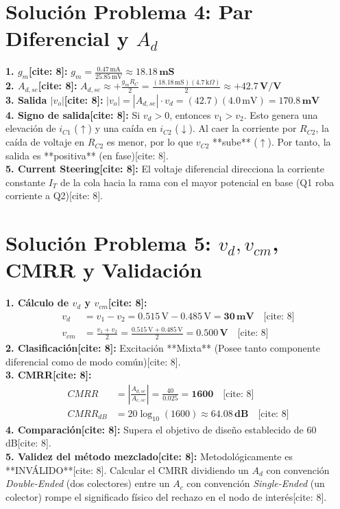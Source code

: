 \documentclass[11pt, a4paper]{article}
\begin{document}
\section*{Solución Problema 4: Par Diferencial y $A_d$}
\textbf{1. $g_m$[cite: 8]:} \quad $\displaystyle g_m = \frac{0.47\,\text{mA}}{25.85\,\text{mV}} \approx \mathbf{18.18\,\text{mS}}$ \\
\textbf{2. $A_{d,se}$[cite: 8]:} \quad $\displaystyle A_{d,se} \approx +\frac{g_m R_C}{2} = \frac{(18.18\,\text{mS})(4.7\,\text{k}\Omega)}{2} \approx \mathbf{+42.7\,\text{V/V}}$ \\
\textbf{3. Salida $|v_o|$[cite: 8]:} \quad $\displaystyle |v_o| = |A_{d,se}| \cdot v_d = (42.7)(4.0\,\text{mV}) = \mathbf{170.8\,\text{mV}}$ \\
\textbf{4. Signo de salida[cite: 8]:} Si $v_d > 0$, entonces $v_1 > v_2$. Esto genera una elevación de $i_{C1}$ ($\uparrow$) y una caída en $i_{C2}$ ($\downarrow$). Al caer la corriente por $R_{C2}$, la caída de voltaje en $R_{C2}$ es menor, por lo que $v_{C2}$ **sube** ($\uparrow$). Por tanto, la salida es **positiva** (en fase)[cite: 8]. \\
\textbf{5. Current Steering[cite: 8]:} El voltaje diferencial direcciona la corriente constante $I_T$ de la cola hacia la rama con el mayor potencial en base (Q1 roba corriente a Q2)[cite: 8].

\section*{Solución Problema 5: $v_d, v_{cm}$, CMRR y Validación}
\textbf{1. Cálculo de $v_d$ y $v_{cm}$[cite: 8]:}
\begin{align*}
    v_d &= v_1 - v_2 = 0.515\,\text{V} - 0.485\,\text{V} = \mathbf{30\,\text{mV}} \quad \text{[cite: 8]} \\
    v_{cm} &= \frac{v_1 + v_2}{2} = \frac{0.515\,\text{V} + 0.485\,\text{V}}{2} = \mathbf{0.500\,\text{V}} \quad \text{[cite: 8]}
\end{align*}
\textbf{2. Clasificación[cite: 8]:} Excitación **Mixta** (Posee tanto componente diferencial como de modo común)[cite: 8]. \\
\textbf{3. CMRR[cite: 8]:}
\begin{align*}
    CMRR &= \left| \frac{A_{d,se}}{A_{c,se}} \right| = \frac{40}{0.025} = \mathbf{1600} \quad \text{[cite: 8]} \\
    CMRR_{dB} &= 20 \log_{10}(1600) \approx \mathbf{64.08\,\text{dB}} \quad \text{[cite: 8]}
\end{align*}
\textbf{4. Comparación[cite: 8]:} Supera el objetivo de diseño establecido de 60 dB[cite: 8]. \\
\textbf{5. Validez del método mezclado[cite: 8]:} Metodológicamente es **INVÁLIDO**[cite: 8]. Calcular el CMRR dividiendo un $A_d$ con convención \textit{Double-Ended} (dos colectores) entre un $A_c$ con convención \textit{Single-Ended} (un colector) rompe el significado físico del rechazo en el nodo de interés[cite: 8].
\end{document}
